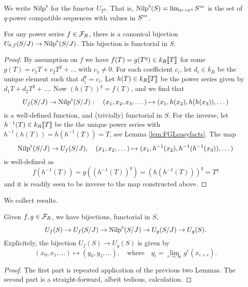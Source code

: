 \documentclass[../main.tex]{subfiles}
\begin{document}
We write ${\mathrm{Nilp}}^\flat$ for the functor $U_{T^q}$. That is, 
${\mathrm{Nilp}}^\flat(S) = \lim_{x \mapsto x^q}S^{\circ \hspace{-0.5pt} \circ}$ is 
the set of $q$-power compatible sequences with values in $S^{\circ \hspace{-0.5pt} \circ}$. 
\begin{lem}
  For any power series $f \in \mathcal{F}_R$, there is a canonical
  bijection $U_{0,f}(S/J) \to {\mathrm{Nilp}}^\flat(S/J)$. This bijection is functorial in 
  $S$.
\begin{proof}
  By assumption on $f$ we have $f(T) = g(T^{q}) \in k_R\llbracket T \rrbracket$ for some 
  $g(T) = c_1T + c_2T^2 + \dots$ with $c_1 \neq 0$. For each coefficient $c_i$, let
  $d_i \in k_R$ be the unique element such that $d_i^{q} = c_i$. Let
  $h(T) \in k_R\llbracket T \rrbracket$ be the power series given by $d_1 T + d_2
  T^2 + \dots$. Now $(h(T))^{q}=f(T)$, and we find that 
  \begin{equation*}
      U_f(S/J) \to {\mathrm{Nilp}}^\flat(S/J): \quad
      (x_1, x_2, x_3, \dots) \mapsto (x_1, h(x_2), h(h(x_3)), \dots)
  \end{equation*}
  is a well-defined function, and (trivially) functorial in $S$. For the
  inverse, let $h^{-1}(T) \in k_R\llbracket T \rrbracket$ be the the unique power
  series with $h^{-1}(h(T))= h(h^{-1}(T)) = T$, see Lemma
  \ref{lem:FGLeasyfacts}. The map
  \begin{equation*}
      {\mathrm{Nilp}}^\flat(S/J) \to U_f(S/J), \quad 
      (x_1, x_2, \dots ) \mapsto (x_1, h^{-1}(x_2), h^{-1}(h^{-1}(x_3)), \dots)
  \end{equation*}
  is well-defined as
  \begin{equation*}
      f(h^{-1}(T)) = g((h^{-1}(T))^{q}) = (h(h^{-1}(T)))^{q} =
      T^{q}
  \end{equation*}
  and it is readily seen to be inverse to the map constructed above.
\end{proof}
\end{lem}

We collect results.
\begin{prop}\label{prop:pHTcalc}
  Given $f,g \in \mathcal{F}_R$, we have bijections, functorial in $S$,
  \begin{equation} 
    U_f(S) \to U_f(S/J) \to {\mathrm{Nilp}}^\flat(S/J) \to U_g(S/J) \to U_g(S).
  \end{equation}
  Explicitely, the bijection $U_f(S) \to U_g(S)$ is given by
  \begin{equation*}
    (x_0, x_1, \dots) \mapsto (y_0, y_1, \dots), \quad \text{where} \quad y_i =
    \lim_{r \to \infty} g^r(x_{i+r}).
  \end{equation*}
\begin{proof}
  The first part is repeated application of the previous two Lemmas. The 
  second part is a straight-forward, albeit tedious, calculation. 
\end{proof}
\end{prop}
\end{document}
